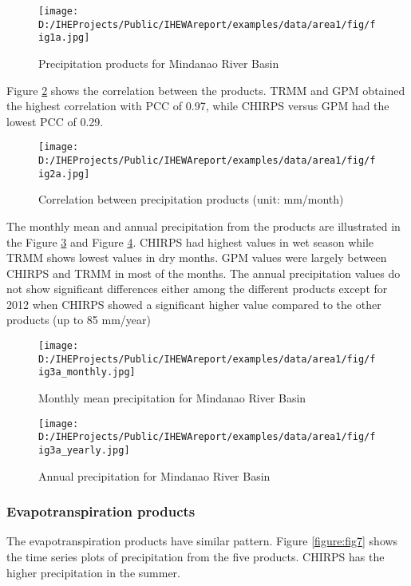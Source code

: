 \documentclass[oneside,openany]{article}%
\begin{document}
\begin{figure}[H]%
\centering%
\texttt{[image: D:/IHEProjects/Public/IHEWAreport/examples/data/area1/fig/fig1a.jpg]}%
\caption{Precipitation products for Mindanao River Basin}%
\label{figure:fig3}%
\end{figure}

%
Figure \ref{figure:fig4} shows the correlation between the products. TRMM and GPM obtained the highest correlation with PCC of 0.97, while CHIRPS versus GPM had the lowest PCC of 0.29.%
\linebreak%


\begin{figure}[H]%
\centering%
\texttt{[image: D:/IHEProjects/Public/IHEWAreport/examples/data/area1/fig/fig2a.jpg]}%
\caption{Correlation between precipitation products (unit: mm/month)}%
\label{figure:fig4}%
\end{figure}

%
The monthly mean and annual precipitation from the products are illustrated in the Figure \ref{figure:fig5} and Figure \ref{figure:fig6}. CHIRPS had highest values in wet season while TRMM shows lowest values in dry months. GPM values were largely between CHIRPS and TRMM in most of the months. The annual precipitation values do not show significant differences either among the different products except for 2012 when CHIRPS showed a significant higher value compared to the other products (up to 85 mm/year)%
\linebreak%


\begin{figure}[H]%
\centering%
\texttt{[image: D:/IHEProjects/Public/IHEWAreport/examples/data/area1/fig/fig3a\_monthly.jpg]}%
\caption{Monthly mean precipitation for Mindanao River Basin}%
\label{figure:fig5}%
\end{figure}

%


\begin{figure}[H]%
\centering%
\texttt{[image: D:/IHEProjects/Public/IHEWAreport/examples/data/area1/fig/fig3a\_yearly.jpg]}%
\caption{Annual precipitation for Mindanao River Basin}%
\label{figure:fig6}%
\end{figure}

%
\subsubsection{Evapotranspiration products}%
\label{ssubsec:Evapotranspirationproducts}%
The evapotranspiration products have similar pattern. Figure \ref{figure:fig7} shows the time series plots of precipitation from the five products. CHIRPS has the higher precipitation in the summer.%
\linebreak%
\end{document}
